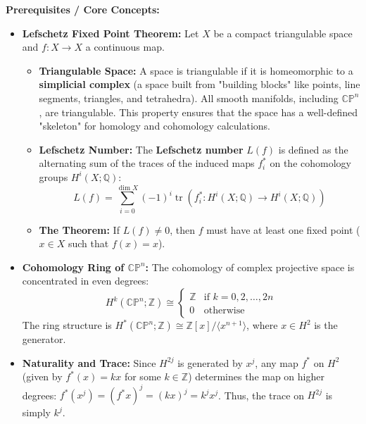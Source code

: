 \begin{solution}
\textbf{Prerequisites / Core Concepts:}
\begin{itemize}
    \item \textbf{Lefschetz Fixed Point Theorem:} Let $X$ be a compact triangulable space and $f: X \to X$ a continuous map.
    \begin{itemize}
        \item \textbf{Triangulable Space:} A space is triangulable if it is homeomorphic to a \textbf{simplicial complex} (a space built from "building blocks" like points, line segments, triangles, and tetrahedra). All smooth manifolds, including $\mathbb{CP}^n$, are triangulable. This property ensures that the space has a well-defined "skeleton" for homology and cohomology calculations.
        \item \textbf{Lefschetz Number:} The \textbf{Lefschetz number} $L(f)$ is defined as the alternating sum of the traces of the induced maps $f^*_i$ on the cohomology groups $H^i(X; \mathbb{Q})$:
        \begin{equation*}
            L(f) = \sum_{i=0}^{\dim X} (-1)^i \operatorname{tr}\left( f^*_i : H^i(X; \mathbb{Q}) \to H^i(X; \mathbb{Q}) \right)
        \end{equation*}
        \item \textbf{The Theorem:} If $L(f) \neq 0$, then $f$ must have at least one fixed point ($x \in X$ such that $f(x) = x$).
    \end{itemize}
    \item \textbf{Cohomology Ring of $\mathbb{CP}^n$:} The cohomology of complex projective space is concentrated in even degrees:
    \begin{equation*}
        H^k(\mathbb{CP}^n; \mathbb{Z}) \cong \begin{cases} \mathbb{Z} & \text{if } k = 0, 2, \dots, 2n \\ 0 & \text{otherwise} \end{cases}
    \end{equation*}
    The ring structure is $H^*(\mathbb{CP}^n; \mathbb{Z}) \cong \mathbb{Z}[x] / \langle x^{n+1} \rangle$, where $x \in H^2$ is the generator.
    \item \textbf{Naturality and Trace:} Since $H^{2j}$ is generated by $x^j$, any map $f^*$ on $H^2$ (given by $f^*(x) = kx$ for some $k \in \mathbb{Z}$) determines the map on higher degrees: $f^*(x^j) = (f^*x)^j = (kx)^j = k^j x^j$. Thus, the trace on $H^{2j}$ is simply $k^j$.
\end{itemize}


\end{solution}
